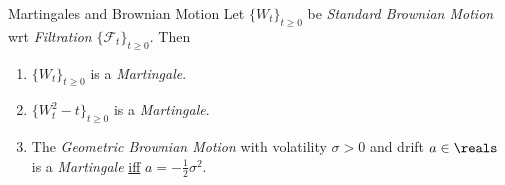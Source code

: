 \documentclass[11pt,a4paper]{article}
\begin{document}
  \begin{proposition}{Martingales and Brownian Motion}\label{pro_martingales_and_brownian_motion}
    Let $\{W_t\}_{t\geq0}$ be \textit{Standard Brownian Motion} wrt \textit{Filtration} $\{\mathcal{F}_t\}_{t\geq0}$. Then
    \begin{enumerate}
      \item $\{W_t\}_{t\geq0}$ is a \textit{Martingale}.
      \item $\{W_t^2-t\}_{t\geq0}$ is a \textit{Martingale}.
      \item The \textit{Geometric Brownian Motion} with volatility $\sigma>0$ and drift $a\in\reals$ is a \textit{Martingale} \underline{iff} $a=-\frac12\sigma^2$.
    \end{enumerate}
  \end{proposition}
\end{document}
